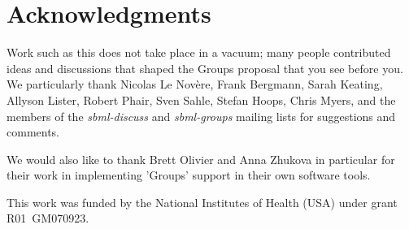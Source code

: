 
\section{Acknowledgments}

Work such as this does not take place in a vacuum; many people contributed ideas and discussions that shaped the Groups proposal that you see before you.  We particularly thank Nicolas Le Nov\`{e}re, Frank Bergmann, Sarah Keating, Allyson Lister, Robert Phair, Sven Sahle, Stefan Hoops, Chris Myers, and the members of the \emph{sbml-discuss} and \emph{sbml-groups} mailing lists for suggestions and comments.

We would also like to thank Brett Olivier and Anna Zhukova in particular for their work in implementing 'Groups' support in their own software tools.

This work was funded by the National Institutes of Health (USA) under grant R01~GM070923.
